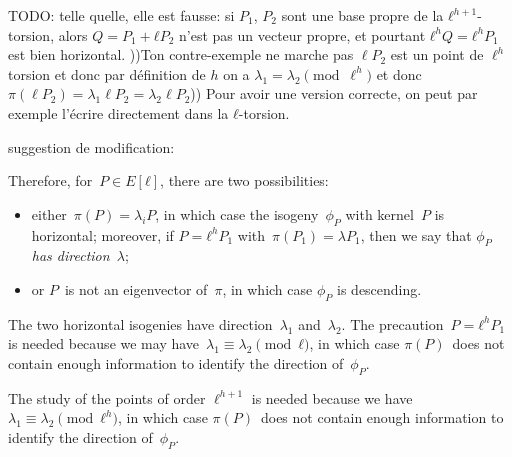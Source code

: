 \documentclass{lms}
\newcommand{\todo}[1]{{\color{red}TODO: #1}}
\begin{document}
\todo{telle quelle, elle est fausse: si $P_1$, $P_2$ sont une base
propre de la $ℓ^{h+1}$-torsion, alors $Q = P_1 + ℓ P_2$ n'est pas un
vecteur propre, et pourtant $ℓ^h Q = ℓ^h P_1$ est bien horizontal. ))Ton contre-exemple ne marche pas $\ell P_2$ est un point de $\ell^h$ torsion et donc par définition de $h$ on a $\lambda_1 = \lambda_2 \pmod \ell^h$ et donc $\pi( \ell P_2)= \lambda_1 \ell P_2 = \lambda_2 \ell P_2$))
Pour avoir une version correcte, on peut par exemple l'écrire directement
dans la $ℓ$-torsion.

suggestion de modification:

Therefore, for~$P ∈ E[ℓ]$, there are two possibilities:
\begin{itemize}
\item either~$π(P) = λ_i P$, in which case
the isogeny~$ϕ_P$ with kernel~$P$ is horizontal;
moreover, if $P = ℓ^{h} P_1$ with~$π(P_1) = λ P_1$,
then we say that \emph{$ϕ_P$ has direction~$λ$};
\item or $P$~is not an eigenvector of~$π$,
in which case $ϕ_P$ is descending.
\end{itemize}
The two horizontal isogenies have direction~$λ_1$ and~$λ_2$.
The precaution~$P = ℓ^h P_1$ is needed because
we may have~$λ_1 ≡ λ_2 \pmod{ℓ}$, in which case $π(P)$~does not contain
enough information to identify the direction of~$ϕ_P$.
}

The study of the points of order $\ell^{h+1}$ is needed because we have~$λ_1 ≡ λ_2 \pmod{ℓ^h}$, in which case $π(P)$~does not contain enough information to identify the direction of~$ϕ_P$.
\end{document}
